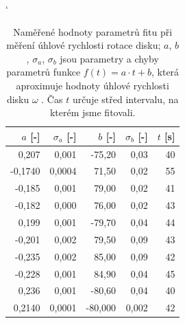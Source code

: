 \documentclass[english]{article}
\begin{document}
\begin{table}[h]
\catcode` %
\parbox{.45\linewidth}{
\centering
    \begin{tabular}{|r|r|r|r|r|}
        \hline
        $a$ [-] & $\sigma_a$ [-] & $b$ [-] & $\sigma_b$ [-] & $t$ [s] \bigstrut\\
        \hline
        0,207 & 0,001 & -75,20 & 0,03  & 40 \bigstrut\\
        \hline
        -0,1740 & 0,0004 & 71,50 & 0,02  & 55 \bigstrut\\
        \hline
        -0,185 & 0,001 & 79,00 & 0,02  & 41 \bigstrut\\
        \hline
        -0,182 & 0,000 & 76,00 & 0,02  & 43 \bigstrut\\
        \hline
        0,199 & 0,001 & -79,70 & 0,04  & 44 \bigstrut\\
        \hline
        -0,201 & 0,002 & 79,50 & 0,09  & 43 \bigstrut\\
        \hline
        -0,235 & 0,002 & 85,00 & 0,09  & 42 \bigstrut\\
        \hline
        -0,228 & 0,001 & 84,90 & 0,04  & 45 \bigstrut\\
        \hline
        0,236 & 0,001 & -80,60 & 0,04  & 40 \bigstrut\\
        \hline
        0,2140 & 0,0001 & -80,000 & 0,002 & 42 \bigstrut\\
        \hline
        \end{tabular}%
    
  \caption{Naměřené hodnoty parametrů fitu při měření úhlové rychlosti rotace disku; $a$, $b$, $\sigma_a$, $\sigma_b$ jsou parametry a chyby parametrů funkce $f(t) = a\cdot t + b$, která aproximuje hodnoty úhlové rychlosti disku $\omega$ . Čas $t$ určuje střed intervalu, na kterém jsme fitovali.}
    \label{tab:gyro_rychlost_fit}%

}
\hfill
\parbox{.45\linewidth}{
\centering
      
}
\end{table}
\end{document}
